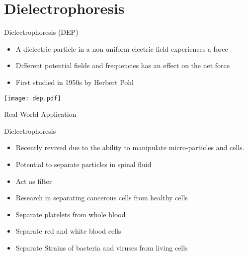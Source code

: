 
\subtitle{for Particle Separation in a Fluid}

\date{27 April 2016}




\begin{frame}
  \maketitle
\end{frame}

\section{Dielectrophoresis}

\begin{frame}{Dielectrophoresis (DEP)}
  \begin{multicols}{2}

  \begin{block}{}
  \begin{itemize}
  \item A dielectric particle in a non uniform 
  electric field experiences a force
  \item Different potential fields and frequencies 
  has an effect on the net force
  \item First studied in 1950s by Herbert Pohl
  \end{itemize}
  \end{block}

  \newpage

  \begin{center}
  \texttt{[image: dep.pdf]}
  \end{center}

  \end{multicols}
\end{frame}

\begin{frame}{Real World Application}
  \begin{block}{Dielectrophoresis}
  \begin{itemize}
    \item Recently revived due to the ability to
  manipulate micro-particles and cells. 
    \item Potential to separate particles in spinal fluid
    \item Act as filter
    \item Research in separating cancerous cells from healthy cells
    \item Separate platelets from whole blood
    \item Separate red and white blood cells
    \item Separate Strains of bacteria and viruses from living cells
  \end{itemize}
  \end{block}
\end{frame}

